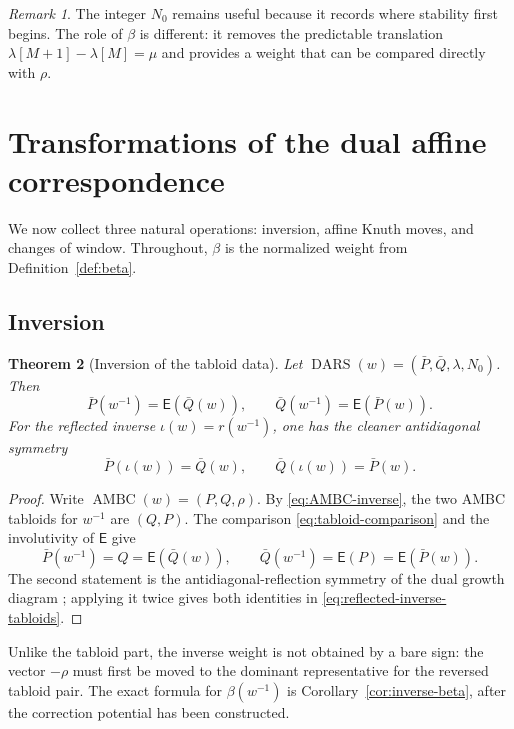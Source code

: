 \documentclass[11pt]{article}
\newtheorem{theorem}{Theorem}[section]
\theoremstyle{definition}
\theoremstyle{remark}
\newtheorem{remark}[theorem]{Remark}
\newcommand{\RSd}{\operatorname{DARS}}
\newcommand{\AMBC}{\operatorname{AMBC}}
\newcommand{\E}{\mathsf E}
\begin{document}
\begin{remark}
The integer \(N_0\) remains useful because it records where stability first begins.
The role of \(\beta\) is different: it removes the predictable translation
\(\lambda[M+1]-\lambda[M]=\mu\) and provides a weight that can be compared directly
with \(\rho\).
\end{remark}

\section{Transformations of the dual affine correspondence}\label{sec:operations}

We now collect three natural operations: inversion, affine Knuth moves, and changes of
window.  Throughout, \(\beta\) is the normalized weight from
Definition~\ref{def:beta}.

\subsection{Inversion}

\begin{theorem}[Inversion of the tabloid data]\label{thm:inverse-tabloids}
Let \(\RSd(w)=(\bar P,\bar Q,\lambda,N_0)\).  Then
\begin{equation}\label{eq:inverse-tabloids}
 \bar P(w^{-1})=\E(\bar Q(w)),
 \qquad
 \bar Q(w^{-1})=\E(\bar P(w)).
\end{equation}
For the reflected inverse \(\iota(w)=r(w^{-1})\), one has the cleaner antidiagonal
symmetry
\begin{equation}\label{eq:reflected-inverse-tabloids}
 \bar P(\iota(w))=\bar Q(w),
 \qquad
 \bar Q(\iota(w))=\bar P(w).
\end{equation}
\end{theorem}

\begin{proof}
Write \(\AMBC(w)=(P,Q,\rho)\).  By \eqref{eq:AMBC-inverse}, the two AMBC tabloids for
\(w^{-1}\) are \((Q,P)\).  The comparison \eqref{eq:tabloid-comparison} and the
involutivity of \(\E\) give
\[
 \bar P(w^{-1})=Q=\E(\bar Q(w)),
 \qquad
 \bar Q(w^{-1})=\E(P)=\E(\bar P(w)).
\]
The second statement is the antidiagonal-reflection symmetry of the dual growth diagram
\cite[Proposition~5.7]{HZ26}; applying it twice gives both identities in
\eqref{eq:reflected-inverse-tabloids}.
\end{proof}

Unlike the tabloid part, the inverse weight is not obtained by a bare sign: the vector
\(-\rho\) must first be moved to the dominant representative for the reversed tabloid
pair.  The exact formula for \(\beta(w^{-1})\) is Corollary~\ref{cor:inverse-beta}, after
the correction potential has been constructed.
\end{document}
